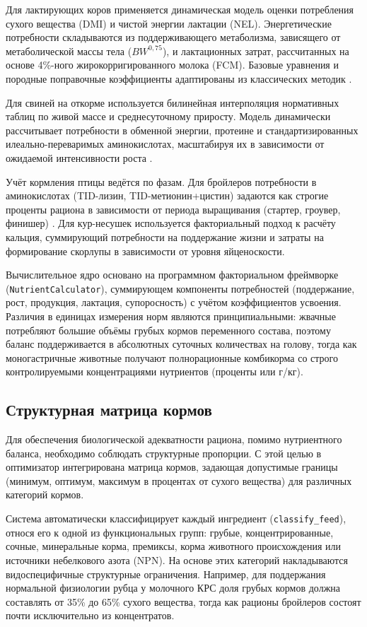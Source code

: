 \documentclass[a4paper,fleqn]{cas-sc}
\begin{document}
Для лактирующих коров применяется динамическая модель оценки потребления сухого вещества (DMI) и чистой энергии лактации (NEL). Энергетические потребности складываются из поддерживающего метаболизма, зависящего от метаболической массы тела ($BW^{0{,}75}$), и лактационных затрат, рассчитанных на основе 4\%-ного жирокорригированного молока (FCM). Базовые уравнения и породные поправочные коэффициенты адаптированы из классических методик \citep{nRC2001, kalashnikov2003}.

Для свиней на откорме используется билинейная интерполяция нормативных таблиц по живой массе и среднесуточному приросту. Модель динамически рассчитывает потребности в обменной энергии, протеине и стандартизированных илеально-переваримых аминокислотах, масштабируя их в зависимости от ожидаемой интенсивности роста \citep{nRC2012}.

Учёт кормления птицы ведётся по фазам. Для бройлеров потребности в аминокислотах (TID-лизин, TID-метионин+цистин) задаются как строгие проценты рациона в зависимости от периода выращивания (стартер, гроувер, финишер) \citep{vnitip2017, nRC1994}. Для кур-несушек используется факториальный подход к расчёту кальция, суммирующий потребности на поддержание жизни и затраты на формирование скорлупы в зависимости от уровня яйценоскости.

Вычислительное ядро основано на программном факториальном фреймворке (\texttt{NutrientCalculator}), суммирующем компоненты потребностей (поддержание, рост, продукция, лактация, супоросность) с учётом коэффициентов усвоения. Различия в единицах измерения норм являются принципиальными: жвачные потребляют большие объёмы грубых кормов переменного состава, поэтому баланс поддерживается в абсолютных суточных количествах на голову, тогда как моногастричные животные получают полнорационные комбикорма со строго контролируемыми концентрациями нутриентов (проценты или г/кг).

\subsection{Структурная матрица кормов}\label{subsec:matrix}

Для обеспечения биологической адекватности рациона, помимо нутриентного баланса, необходимо соблюдать структурные пропорции. С этой целью в оптимизатор интегрирована матрица кормов, задающая допустимые границы (минимум, оптимум, максимум в процентах от сухого вещества) для различных категорий кормов.

Система автоматически классифицирует каждый ингредиент (\texttt{classify\_feed}), относя его к одной из функциональных групп: грубые, концентрированные, сочные, минеральные корма, премиксы, корма животного происхождения или источники небелкового азота (NPN). На основе этих категорий накладываются видоспецифичные структурные ограничения. Например, для поддержания нормальной физиологии рубца у молочного КРС доля грубых кормов должна составлять от 35\% до 65\% сухого вещества, тогда как рационы бройлеров состоят почти исключительно из концентратов.
\end{document}
